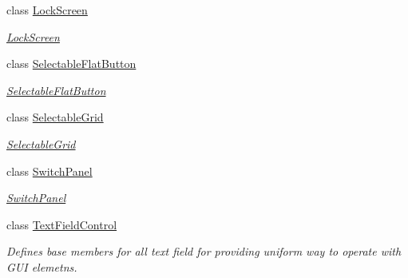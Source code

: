 \begin{DoxyCompactItemize}
class \mbox{\hyperlink{class_wpf_handler_1_1_u_i_1_1_controls_1_1_lock_screen}{Lock\+Screen}}
\begin{DoxyCompactList}\small\item\em \mbox{\hyperlink{class_wpf_handler_1_1_u_i_1_1_controls_1_1_lock_screen}{Lock\+Screen}} \end{DoxyCompactList}\item 
class \mbox{\hyperlink{class_wpf_handler_1_1_u_i_1_1_controls_1_1_selectable_flat_button}{Selectable\+Flat\+Button}}
\begin{DoxyCompactList}\small\item\em \mbox{\hyperlink{class_wpf_handler_1_1_u_i_1_1_controls_1_1_selectable_flat_button}{Selectable\+Flat\+Button}} \end{DoxyCompactList}\item 
class \mbox{\hyperlink{class_wpf_handler_1_1_u_i_1_1_controls_1_1_selectable_grid}{Selectable\+Grid}}
\begin{DoxyCompactList}\small\item\em \mbox{\hyperlink{class_wpf_handler_1_1_u_i_1_1_controls_1_1_selectable_grid}{Selectable\+Grid}} \end{DoxyCompactList}\item 
class \mbox{\hyperlink{class_wpf_handler_1_1_u_i_1_1_controls_1_1_switch_panel}{Switch\+Panel}}
\begin{DoxyCompactList}\small\item\em \mbox{\hyperlink{class_wpf_handler_1_1_u_i_1_1_controls_1_1_switch_panel}{Switch\+Panel}} \end{DoxyCompactList}\item 
class \mbox{\hyperlink{class_wpf_handler_1_1_u_i_1_1_controls_1_1_text_field_control}{Text\+Field\+Control}}
\begin{DoxyCompactList}\small\item\em Defines base members for all text field for providing uniform way to operate with G\+UI elemetns. \end{DoxyCompactList}\end{DoxyCompactItemize}
